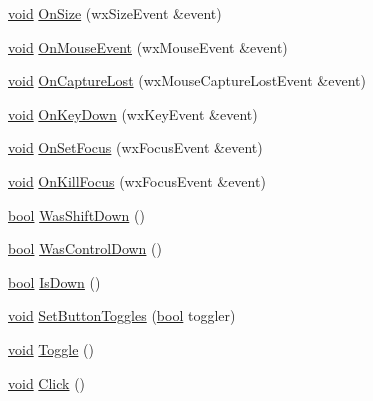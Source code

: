 \begin{DoxyCompactItemize}
\item 
\hyperlink{sound_8c_ae35f5844602719cf66324f4de2a658b3}{void} \hyperlink{class_a_button_a4ae12be3ad3879770c8f70fbbe828fb0}{On\+Size} (wx\+Size\+Event \&event)
\item 
\hyperlink{sound_8c_ae35f5844602719cf66324f4de2a658b3}{void} \hyperlink{class_a_button_a8ac23eb7e93f7becbff55ec57dcf4de6}{On\+Mouse\+Event} (wx\+Mouse\+Event \&event)
\item 
\hyperlink{sound_8c_ae35f5844602719cf66324f4de2a658b3}{void} \hyperlink{class_a_button_aeadcce9652a8c0693c25bd06d8900d5a}{On\+Capture\+Lost} (wx\+Mouse\+Capture\+Lost\+Event \&event)
\item 
\hyperlink{sound_8c_ae35f5844602719cf66324f4de2a658b3}{void} \hyperlink{class_a_button_abef647b913081a2309a675509cdbc7fb}{On\+Key\+Down} (wx\+Key\+Event \&event)
\item 
\hyperlink{sound_8c_ae35f5844602719cf66324f4de2a658b3}{void} \hyperlink{class_a_button_a4ca506426c5899231f716c24214fd494}{On\+Set\+Focus} (wx\+Focus\+Event \&event)
\item 
\hyperlink{sound_8c_ae35f5844602719cf66324f4de2a658b3}{void} \hyperlink{class_a_button_a4ceeb7d8fdf6358465b8a407efadbc01}{On\+Kill\+Focus} (wx\+Focus\+Event \&event)
\item 
\hyperlink{mac_2config_2i386_2lib-src_2libsoxr_2soxr-config_8h_abb452686968e48b67397da5f97445f5b}{bool} \hyperlink{class_a_button_ab308f9dcbf5867904910c47658293720}{Was\+Shift\+Down} ()
\item 
\hyperlink{mac_2config_2i386_2lib-src_2libsoxr_2soxr-config_8h_abb452686968e48b67397da5f97445f5b}{bool} \hyperlink{class_a_button_a7184b1b41e15b4a1348b79cc6f718d21}{Was\+Control\+Down} ()
\item 
\hyperlink{mac_2config_2i386_2lib-src_2libsoxr_2soxr-config_8h_abb452686968e48b67397da5f97445f5b}{bool} \hyperlink{class_a_button_a40ca9be73e90b8a1c01e8f8299a4fe05}{Is\+Down} ()
\item 
\hyperlink{sound_8c_ae35f5844602719cf66324f4de2a658b3}{void} \hyperlink{class_a_button_a546c52145149b41d9954d48901d53015}{Set\+Button\+Toggles} (\hyperlink{mac_2config_2i386_2lib-src_2libsoxr_2soxr-config_8h_abb452686968e48b67397da5f97445f5b}{bool} toggler)
\item 
\hyperlink{sound_8c_ae35f5844602719cf66324f4de2a658b3}{void} \hyperlink{class_a_button_ab3d266034c59af0a8617495850dfbe7f}{Toggle} ()
\item 
\hyperlink{sound_8c_ae35f5844602719cf66324f4de2a658b3}{void} \hyperlink{class_a_button_a48fb77fb8c75116721a11a3d0c91ee91}{Click} ()

\end{DoxyCompactItemize}
